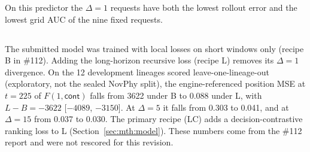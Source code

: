 \begin{revblock}
On this predictor the $\Delta=1$ requests have both the lowest rollout error and the lowest grid AUC of the nine fixed requests.
\end{revblock}

\subsection{\texorpdfstring{}{Short-window and long-horizon training}}
\label{sec:app:res:rollout}

\begin{revblock}
\nopagebreak
The submitted model was trained with local losses on short windows only (recipe B in \#112). Adding the long-horizon recursive loss (recipe L) removes its $\Delta=1$ divergence. On the 12 development lineages scored leave-one-lineage-out (exploratory, not the sealed NovPhy split), the engine-referenced position MSE at $t=225$ of $F(1,\textsf{cont})$ falls from 3622 under B to 0.088 under L, with $L-B=-3622$ [$-4089$, $-3150$]. At $\Delta=5$ it falls from 0.303 to 0.041, and at $\Delta=15$ from 0.037 to 0.030. The primary recipe (LC) adds a decision-contrastive ranking loss to L (Section~\ref{sec:mth:model}). These numbers come from the \#112 report and were not rescored for this revision.
\end{revblock}

\subsection{\texorpdfstring{}{Sharing: per-request tables}}
\label{sec:app:res:sharing}

